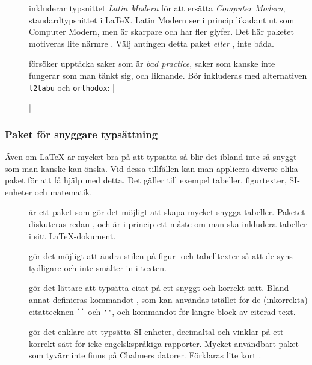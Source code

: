 \documentclass[lang=sv,ptsize=10pt,font=none,nomath,titles=bf,../../a4.tex]{subfiles}
\begin{document}
\begin{description}
	\item[]
	inkluderar typsnittet \emph{Latin Modern} för att ersätta
	\emph{Computer Modern}, standardtypsnittet i \LaTeX. Latin Modern ser
	i princip likadant ut som Computer Modern, men är skarpare och har
	fler glyfer. Det här paketet motiveras lite närmre
	. Välj antingen detta paket \emph{eller}
	, inte båda.
	
	\item[\emph{}]
	försöker upptäcka saker som är \emph{bad practice}, saker som kanske
	inte fungerar som man tänkt sig, och liknande. Bör inkluderas med
	alternativen \texttt{l2tabu} och \texttt{orthodox}:
	\latex|\usepackage[l2tabu,orthodox]{nag}|
\end{description}

\subsubsection{Paket för snyggare typsättning}
Även om \LaTeX{} är mycket bra på att typsätta så blir det ibland inte
så snyggt som man kanske kan önska. Vid dessa tillfällen kan man
applicera diverse olika paket för att få hjälp med detta. Det gäller
till exempel tabeller, figurtexter, SI-enheter och matematik.

\begin{description}
	\item[]
	är ett paket som gör det möjligt att skapa mycket snygga tabeller.
	Paketet diskuteras redan , och är i princip
	ett måste om man ska inkludera tabeller i sitt \LaTeX-dokument.

	\item[]
	gör det möjligt att ändra stilen på figur- och tabelltexter så att de
	syns tydligare och inte smälter in i texten.

	\item[]
	gör det lättare att typsätta citat på ett snyggt och korrekt sätt.
	Bland annat definieras kommandot , som kan användas
	istället för de (inkorrekta) citattecknen \verb|``| och \verb|''|, 
	och kommandot  för längre block av citerad text.
	
	\item[\emph{}]
	gör det enklare att typsätta SI-enheter, decimaltal och vinklar på ett
	korrekt sätt för icke engelskspråkiga rapporter. Mycket användbart
	paket som tyvärr inte finns på Chalmers datorer. Förklaras lite kort
	.
\end{description}
\end{document}
